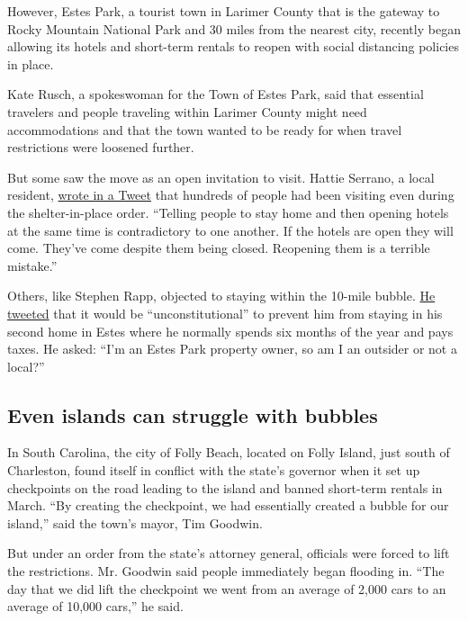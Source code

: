 However, Estes Park, a tourist town in Larimer County that is the
gateway to Rocky Mountain National Park and 30 miles from the nearest
city, recently began allowing its hotels and short-term rentals to
reopen with social distancing policies in place.

Kate Rusch, a spokeswoman for the Town of Estes Park, said that
essential travelers and people traveling within Larimer County might
need accommodations and that the town wanted to be ready for when travel
restrictions were loosened further.

But some saw the move as an open invitation to visit. Hattie Serrano, a
local resident,
\href{https://twitter.com/themadhattiee/status/1253779577400430594}{wrote
in a Tweet} that hundreds of people had been visiting even during the
shelter-in-place order. ``Telling people to stay home and then opening
hotels at the same time is contradictory to one another. If the hotels
are open they will come. They've come despite them being closed.
Reopening them is a terrible mistake.''

Others, like Stephen Rapp, objected to staying within the 10-mile
bubble.
\href{https://twitter.com/StephenRapp3/status/1253786973002702849}{He
tweeted} that it would be ``unconstitutional'' to prevent him from
staying in his second home in Estes where he normally spends six months
of the year and pays taxes. He asked: ``I'm an Estes Park property
owner, so am I an outsider or not a local?''

\hypertarget{even-islands-can-struggle-with-bubbles}{%
\subsection{Even islands can struggle with
bubbles}\label{even-islands-can-struggle-with-bubbles}}

In South Carolina, the city of Folly Beach, located on Folly Island,
just south of Charleston, found itself in conflict with the state's
governor when it set up checkpoints on the road leading to the island
and banned short-term rentals in March. ``By creating the checkpoint, we
had essentially created a bubble for our island,'' said the town's
mayor, Tim Goodwin.

But under an order from the state's attorney general, officials were
forced to lift the restrictions. Mr. Goodwin said people immediately
began flooding in. ``The day that we did lift the checkpoint we went
from an average of 2,000 cars to an average of 10,000 cars,'' he said.


